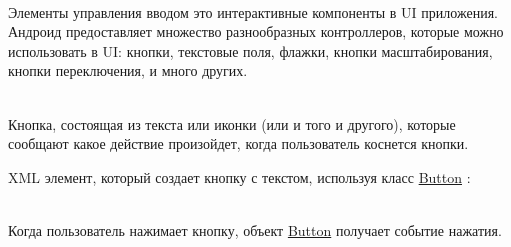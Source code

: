 
\newcommand{\Button}{
  \href{https://developer.android.com/reference/android/widget/Button.html}{Button}
}

\newcommand{\Activity}{
  \href{https://developer.android.com/reference/android/app/Activity.html}{Activity}
}

\newcommand{\OnClickListener}{
  \href{https://developer.android.com/reference/android/view/View.OnClickListener.html}{View.OnClickListener}
}

\newcommand{\EditText}{
  \href{https://developer.android.com/reference/android/widget/EditText.html}{EditText}
}

\newcommand{\OnEditorActionListener}{
  \href{https://developer.android.com/reference/android/widget/TextView.OnEditorActionListener.html}{TextView.OnEditorActionListener}
}

\newcommand{\Checkbox}{
  \href{https://developer.android.com/reference/android/widget/CheckBox.html}{Checkbox}
}

\newcommand{\RadioButton}{
  \href{https://developer.android.com/reference/android/widget/RadioButton.html}{RadioButton}
}

\newcommand{\ToggleButton}{
  \href{https://developer.android.com/guide/topics/ui/controls/togglebutton.html}{ToggleButton}
}

\newcommand{\Spinner}{
  \href{https://developer.android.com/reference/android/widget/Spinner.html}{Spinner}
}


\\
Элементы управления вводом это интерактивные компоненты в UI приложения.
Андроид предоставляет множество разнообразных контроллеров, которые можно
использовать в UI: кнопки, текстовые поля, флажки, кнопки
масштабирования, кнопки переключения, и много других.

\\
Кнопка, состоящая из текста или иконки (или и того и другого), которые сообщают
какое действие произойдет, когда пользователь коснется кнопки.

XML элемент, который создает кнопку с текстом, используя класс \Button:

\\
Когда пользователь нажимает кнопку, объект \Button получает событие нажатия.

